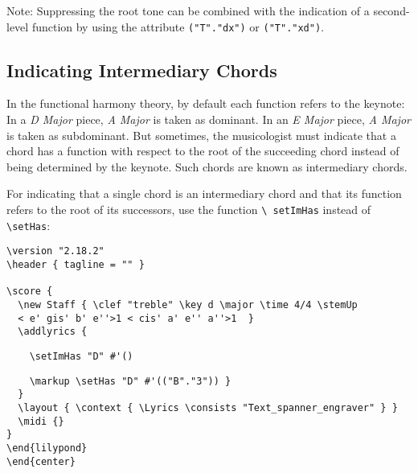 \documentclass[
  DIV=calc,
  BCOR=5mm,
  12pt,
  headings=small,
  oneside,
  abstract=true,
  toc=bib,
  xcolor=dvipsnames,
  openany,
  ngerman,english]{scrartcl}
\newcommand{\acc}[0]{\textit}
\begin{document}
Note: Suppressing the root tone can be combined with the indication of a
second-level function by using the attribute \texttt{("T"."dx")} or
\texttt{("T"."xd")}.

\subsection{Indicating Intermediary Chords}

In the functional harmony theory, by default each function refers to the
keynote: In a \acc{D Major} piece, \acc{A Major} is taken as dominant. In an
\acc{E Major} piece, \acc{A Major} is taken as subdominant. But sometimes, the
musicologist must indicate that a chord has a function with respect to the root
of the succeeding chord instead of being determined by the keynote. Such chords
are known as intermediary chords.

For indicating that a single chord is an intermediary chord and that its function
refers to the root of its successors, use the function \texttt{\textbackslash
setImHas} instead of \texttt{\textbackslash setHas}:

\begin{center}
\end{center}

\begin{scriptsize}
\begin{verbatim}
\version "2.18.2"
\header { tagline = "" }

\score {
  \new Staff { \clef "treble" \key d \major \time 4/4 \stemUp 
  < e' gis' b' e''>1 < cis' a' e'' a''>1  }
  \addlyrics { 
\end{verbatim}
{ \color{red} \verb|    \setImHas "D" #'() | }
\begin{verbatim}  
    \markup \setHas "D" #'(("B"."3")) }  
  }
  \layout { \context { \Lyrics \consists "Text_spanner_engraver" } }
  \midi {}
}
\end{lilypond}
\end{center}
\end{verbatim}
\end{scriptsize} 
 
\end{document}
